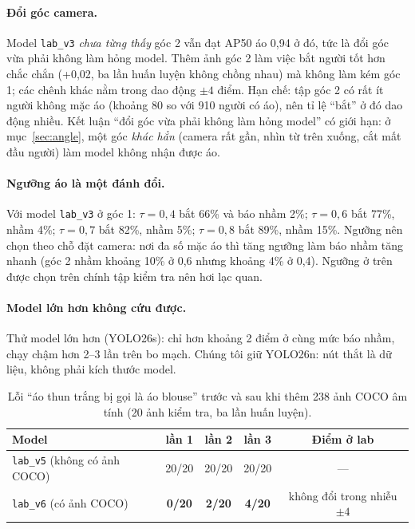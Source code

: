 \documentclass[12pt,a4paper]{article}
\begin{document}
\paragraph{Đổi góc camera.} Model \texttt{lab\_v3} \emph{chưa từng thấy} góc 2 vẫn đạt AP50 áo 0,94 ở đó, tức là đổi
góc vừa phải không làm hỏng model. Thêm ảnh góc 2 làm việc bắt người tốt hơn chắc chắn (+0,02, ba lần huấn luyện không
chồng nhau) mà không làm kém góc 1; các chênh khác nằm trong dao động $\pm4$ điểm. Hạn chế: tập góc 2 có rất ít người
không mặc áo (khoảng 80 so với 910 người có áo), nên tỉ lệ ``bắt'' ở đó dao động nhiều. Kết luận ``đổi góc vừa phải không làm hỏng model'' có
giới hạn: ở mục~\ref{sec:angle}, một góc \emph{khác hẳn} (camera rất gần, nhìn từ trên xuống, cắt mất đầu người) làm model không nhận được áo.

\paragraph{Ngưỡng áo là một đánh đổi.} Với model \texttt{lab\_v3} ở góc 1: $\tau=0{,}4$ bắt 66\% và báo nhầm 2\%;
$\tau=0{,}6$ bắt 77\%, nhầm 4\%; $\tau=0{,}7$ bắt 82\%, nhầm 5\%; $\tau=0{,}8$ bắt 89\%, nhầm 15\%. Ngưỡng nên chọn theo
chỗ đặt camera: nơi đa số mặc áo thì tăng ngưỡng làm báo nhầm tăng nhanh (góc 2 nhầm khoảng 10\% ở 0,6 nhưng khoảng 4\%
ở 0,4). Ngưỡng ở trên được chọn trên chính tập kiểm tra nên hơi lạc quan.

\paragraph{Model lớn hơn không cứu được.} Thử model lớn hơn (YOLO26s): chỉ hơn khoảng 2 điểm ở cùng mức báo
nhầm, chạy chậm hơn 2--3 lần trên bo mạch. Chúng tôi giữ YOLO26n: nút thắt là dữ liệu, không phải kích thước model.

\begin{table}[ht]
\centering
\caption{Lỗi ``áo thun trắng bị gọi là áo blouse'' trước và sau khi thêm 238 ảnh COCO âm tính (20 ảnh kiểm tra, ba lần huấn luyện).}
\label{tab:coco}
\begin{tabular}{lcccc}
\toprule
Model & lần 1 & lần 2 & lần 3 & Điểm ở lab \\
\midrule
\texttt{lab\_v5} (không có ảnh COCO) & 20/20 & 20/20 & 20/20 & --- \\
\texttt{lab\_v6} (có ảnh COCO) & \textbf{0/20} & \textbf{2/20} & \textbf{4/20} & không đổi trong nhiễu $\pm4$ \\
\bottomrule
\end{tabular}
\end{table}
\end{document}
